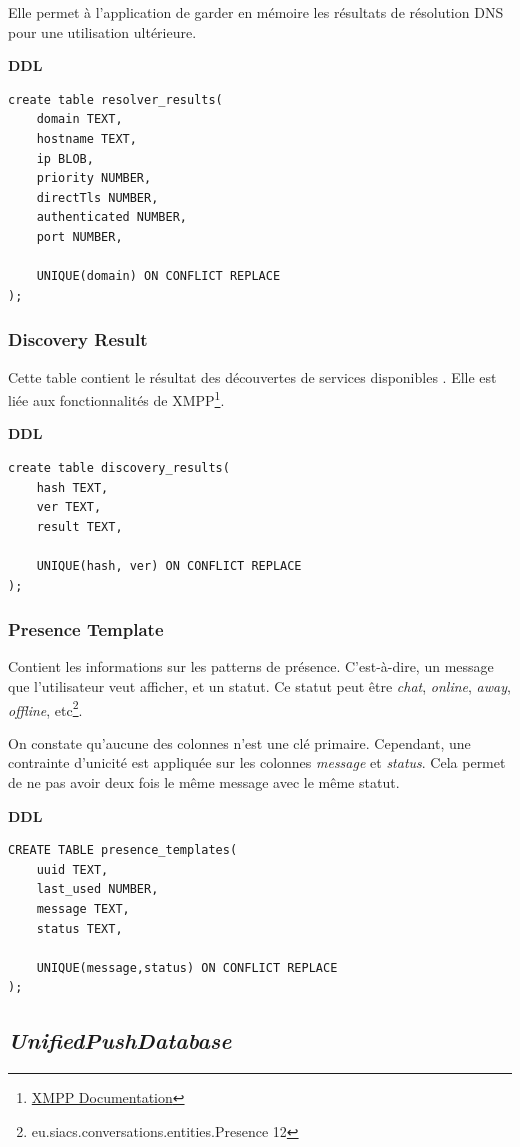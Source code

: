 \documentclass[a4paper,11pt]{article}
\begin{document}
Elle permet à l'application de garder en mémoire les résultats de résolution DNS pour une utilisation ultérieure.

\textbf{DDL}
\begin{lstlisting}
create table resolver_results(
    domain TEXT,
    hostname TEXT,
    ip BLOB,
    priority NUMBER,
    directTls NUMBER,
    authenticated NUMBER,
    port NUMBER,
    
    UNIQUE(domain) ON CONFLICT REPLACE
);
\end{lstlisting}
\subsubsection*{Discovery Result}

Cette table contient le résultat des découvertes de services disponibles . Elle est liée aux fonctionnalités de XMPP\footnote{\href{https://xmpp.org/extensions/xep-0030.html}{XMPP Documentation}}.

\textbf{DDL}
\begin{lstlisting}
create table discovery_results(
    hash TEXT,
    ver TEXT,
    result TEXT,
    
    UNIQUE(hash, ver) ON CONFLICT REPLACE
);
\end{lstlisting}
\subsubsection*{Presence Template}

Contient les informations sur les patterns de présence. C'est-à-dire, un message que l'utilisateur veut afficher, et un statut. Ce statut peut être \textit{chat}, \textit{online}, \textit{away}, \textit{offline}, etc\footnote{eu.siacs.conversations.entities.Presence 12}.

On constate qu'aucune des colonnes n'est une clé primaire. Cependant, une contrainte d'unicité est appliquée sur les colonnes \textit{message} et \textit{status}. Cela permet de ne pas avoir deux fois le même message avec le même statut.

\textbf{DDL}
\begin{lstlisting}
CREATE TABLE presence_templates(
    uuid TEXT,
    last_used NUMBER,
    message TEXT,
    status TEXT,
    
    UNIQUE(message,status) ON CONFLICT REPLACE
);
\end{lstlisting}

\subsection*{\textit{UnifiedPushDatabase}}
\end{document}
